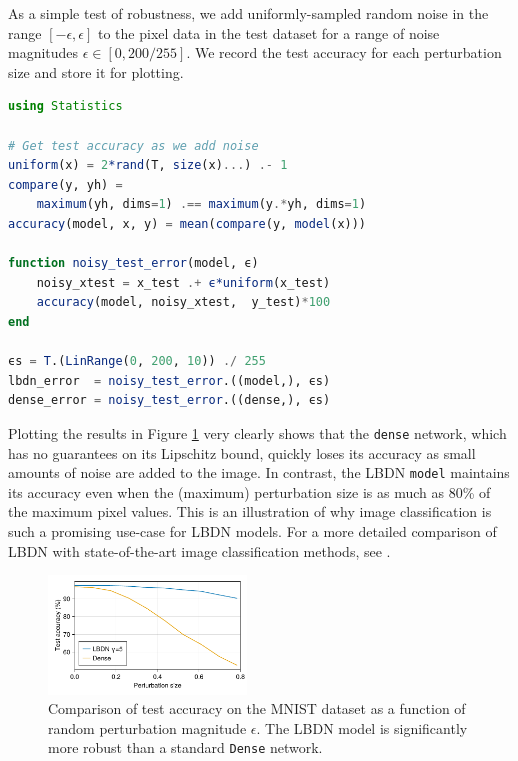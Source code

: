 As a simple test of robustness, we add uniformly-sampled random noise in the range $[-\epsilon, \epsilon]$ to the pixel data in the test dataset for a range of noise magnitudes $\epsilon \in [0, 200/255].$ We record the test accuracy for each perturbation size and store it for plotting.
\begin{lstlisting}[language = Julia]
using Statistics

# Get test accuracy as we add noise
uniform(x) = 2*rand(T, size(x)...) .- 1
compare(y, yh) = 
    maximum(yh, dims=1) .== maximum(y.*yh, dims=1)
accuracy(model, x, y) = mean(compare(y, model(x)))
    
function noisy_test_error(model, ϵ)
    noisy_xtest = x_test .+ ϵ*uniform(x_test)
    accuracy(model, noisy_xtest,  y_test)*100
end

ϵs = T.(LinRange(0, 200, 10)) ./ 255
lbdn_error  = noisy_test_error.((model,), ϵs)
dense_error = noisy_test_error.((dense,), ϵs)
\end{lstlisting}

Plotting the results in Figure \ref{fig:mnist_robust} very clearly shows that the \verb|dense| network, which has no guarantees on its Lipschitz bound, quickly loses its accuracy as small amounts of noise are added to the image. In contrast, the LBDN \verb|model| maintains its accuracy even when the (maximum) perturbation size is as much as 80\% of the maximum pixel values. This is an illustration of why image classification is such a promising use-case for LBDN models. For a more detailed comparison of LBDN with state-of-the-art image classification methods, see \cite{Wang+Manchester2023}.

\begin{figure}[!b]
    \centering
    \includegraphics[width=0.47\textwidth]{Images/lbdn_mnist_robust.pdf}
    \caption{Comparison of test accuracy on the MNIST dataset as a function of random perturbation magnitude $\epsilon$. The LBDN model is significantly more robust than a standard \texttt{Dense} network.}
    \label{fig:mnist_robust}
\end{figure}
